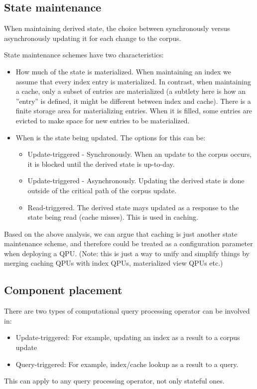 \subsection{State maintenance}
When maintaining derived state, the choice between synchronously versus
asynchronously updating it for each change to the corpus.

State maintenance schemes have two characteristics:
\begin{itemize}
  \item How much of the state is materialized.
  When maintaining an index we assume that every index entry is materialized.
  In contrast, when maintaining a cache, only a subset of entries are
  materialized
  (a subtlety here is how an ''entry'' is defined, it might be different between
  index and cache).
  There is a finite storage area for materializing entries.
  When it is filled, some entries are evicted to make space for new entries to
  be materialized.
  \item When is the state being updated.
  The options for this can be:
  \begin{itemize}
    \item Update-triggered - Synchronously. When an update to the corpus
    occurs, it is blocked until the derived state is up-to-day.
    \item Update-triggered - Asynchronously. Updating the derived state is done
    outside of the critical path of the corpus update.
    \item Read-triggered. The derived state mays updated as a response to the
    state being read (cache misses).
    This is used in caching.
  \end{itemize}
\end{itemize}
  Based on the above analysis, we can argue that caching is just another state
  maintenance scheme, and therefore could be treated as a configuration
  parameter when deploying a QPU.
  (Note: this is just a way to unify and simplify things by merging caching
  QPUs with index QPUs, materialized view QPUs etc.)

\subsection{Component placement}
There are two types of computational query processing operator can be
involved in:
\begin{itemize}
  \item Update-triggered: For example, updating an index as a result to a corpus
  update
  \item Query-triggered: For example, index/cache lookup as a result to a query.
\end{itemize}
This can apply to any query processing operator, not only stateful ones.

